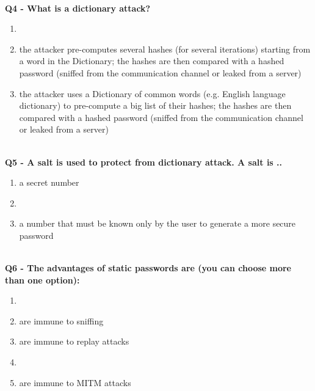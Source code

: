 \textbf{\\Q4 - What is a dictionary attack?}
\begin{enumerate}
	\item[A.] 
	\item[B.] the attacker pre-computes several hashes (for several iterations) starting from a word in the Dictionary; the hashes are then compared with a hashed password (sniffed from the communication channel or leaked from a server)
	\item[C.] the attacker uses a Dictionary of common words (e.g. English language dictionary) to pre-compute a big list of their hashes; the hashes are then compared with a hashed password (sniffed from the communication channel or leaked from a server)
\end{enumerate}

\textbf{\\Q5 - A salt is used to protect from dictionary attack. A salt is ..}
\begin{enumerate}
	\item[A.] a secret number
	\item[B.] 
	\item[C.] a number that must be known only by the user to generate a more secure password
\end{enumerate}

\textbf{\\Q6 - The advantages of static passwords are (you can choose more than one option):}
\begin{enumerate}
	\item[A.] 
	\item[B.] are immune to sniffing
	\item[C.] are immune to replay attacks
	\item[D.] 
	\item[E.] are immune to MITM attacks
\end{enumerate}

